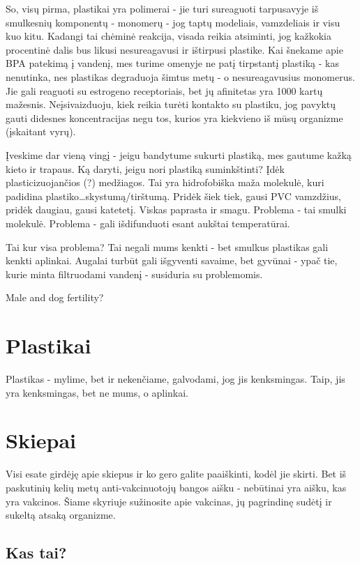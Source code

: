 \documentclass[]{book}
\begin{document}
So, visų pirma, plastikai yra polimerai - jie turi sureaguoti tarpusavyje iš smulkesnių komponentų - monomerų - jog taptų modeliais, vamzdeliais ir visu kuo kitu. Kadangi tai chėminė reakcija, visada reikia atsiminti, jog kažkokia procentinė dalis bus likusi nesureagavusi ir ištirpusi plastike. Kai šnekame apie BPA patekimą į vandenį, mes turime omenyje ne patį tirpstantį plastiką - kas nenutinka, nes plastikas degraduoja šimtus metų - o nesureagavusius monomerus. Jie gali reaguoti su estrogeno receptoriais, bet jų afinitetas yra 1000 kartų mažesnis. Neįsivaizduoju, kiek reikia turėti kontakto su plastiku, jog pavyktų gauti didesnes koncentracijas negu tos, kurios yra kiekvieno iš mūsų organizme (įskaitant vyrų).

Įveskime dar vieną vingį - jeigu bandytume sukurti plastiką, mes gautume kažką kieto ir trapaus. Ką daryti, jeigu nori plastiką suminkštinti? Įdėk plasticizuojančios (?) medžiagos. Tai yra hidrofobiška maža molekulė, kuri padidina plastiko\ldots{}skystumą/tirštumą. Pridėk šiek tiek, gausi PVC vamzdžius, pridėk daugiau, gausi katetetį. Viskas paprasta ir smagu. Problema - tai smulki molekulė. Problema - gali išdifunduoti esant aukštai temperatūrai.

Tai kur visa problema? Tai negali mums kenkti - bet smulkus plastikas gali kenkti aplinkai. Augalai turbūt gali išgyventi savaime, bet gyvūnai - ypač tie, kurie minta filtruodami vandenį - susiduria su problemomis.

Male and dog fertility?

\hypertarget{plastikai}{%
\chapter{Plastikai}\label{plastikai}}

Plastikas - mylime, bet ir nekenčiame, galvodami, jog jis kenksmingas. Taip, jis yra kenksmingas, bet ne mums, o aplinkai.

\hypertarget{skiepai-1}{%
\chapter{Skiepai}\label{skiepai-1}}

Visi esate girdėję apie skiepus ir ko gero galite paaiškinti, kodėl jie skirti. Bet iš paskutinių kelių metų anti-vakcinuotojų bangos aišku - nebūtinai yra aišku, kas yra vakcinos. Šiame skyriuje sužinosite apie vakcinas, jų pagrindinę sudėtį ir sukeltą atsaką organizme.

\hypertarget{kas-tai}{%
\section{Kas tai?}\label{kas-tai}}
\end{document}
